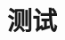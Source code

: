 \documentclass{YNUthesis}
\begin{document}
\tableofcontents
\chapter{测试}
\zhlipsum[10]
\end{document}
